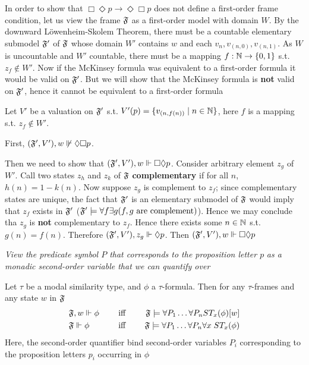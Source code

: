 \documentclass[11pt]{article}
\begin{document}
\begin{examplle}[]
In order to show that \(\Box\Diamond p\to\Diamond\Box p\) does not define a
first-order frame condition, let us view the frame \(\mathfrak{F}\) as a first-order
model with domain \(W\). By the downward Löwenheim-Skolem Theorem, there must
be a countable elementary submodel \(\mathfrak{F}'\) of \(\mathfrak{F}\) whose domain \(W'\)
contains \(w\) and each \(v_n,v_{(n,0)},v_{(n,1)}\). As \(W\) is uncountable
and \(W'\) countable, there must be a mapping \(f:\mathbb{N}\to\{0,1\}\) s.t.
\(z_f\not\in W'\). Now if the McKinsey formula was equivalent to a
first-order formula it would be valid on \(\mathfrak{F}'\). But we will show that the
McKinsey formula is \textbf{not} valid on \(\mathfrak{F}'\), hence it cannot be equivalent to a
first-order formula

Let \(V'\) be a valuation on \(\mathfrak{F}'\) s.t. \(V'(p)=\{v_{(n,f(n))}\mid
   n\in\mathbb{N}\}\), here  \(f\) is a mapping s.t. \(z_f\not\in W'\).

First, \((\mathfrak{F}',V'),w\not\Vdash\Diamond\Box p\).

Then we need to show that \((\mathfrak{F}',V'),w\Vdash\Box\Diamond p\). Consider
arbitrary element \(z_g\) of \(W'\). Call two states \(z_h\) and \(z_k\) of
\(\mathfrak{F}\) \textbf{complementary} if for all \(n\), \(h(n)=1-k(n)\). Now suppose \(z_g\)
is complement to \(z_f\); since complementary states are unique, the fact
that \(\mathfrak{F}'\) is an elementary submodel of \(\mathfrak{F}\) would imply that \(z_f\)
exists in \(\mathfrak{F}'\) (\(\mathfrak{F}'\models\forall f\exists g(f,g\text{ are
   complement})\)). Hence we may conclude tha \(z_g\) is \textbf{not} complementary to
\(z_f\). Hence there exists some \(n\in\mathbb{N}\) s.t. \(g(n)=f(n)\). Therefore
\((\mathfrak{F}',V'),z_g\Vdash\Diamond p\). Then \((\mathfrak{F}',V'),w\Vdash\Box\Diamond p\)
\end{examplle}

\begin{center}
\emph{View the predicate symbol \(P\) that corresponds to the proposition letter
\(p\)}
\emph{as a monadic second-order variable that we can quantify over}
\end{center}

\begin{proposition}[]
Let \(\tau\) be a modal similarity type, and \(\phi\) a \(\tau\)-formula. Then for any
\(\tau\)-frames and any state \(w\) in \(\mathfrak{F}\)
\begin{alignat*}{3}
&\mathfrak{F},w\Vdash\phi&\quad\text{ iff }\quad&&\mathfrak{F}\models\forall P_1\dots\forall P_n ST_x(\phi)[w]\\
&\mathfrak{F}\Vdash\phi&\quad\text{ iff }\quad&&\mathfrak{F}\models\forall P_1\dots\forall P_n \forall x\; ST_x(\phi)
\end{alignat*}
Here, the second-order quantifier bind second-order variables \(P_i\)
corresponding to the proposition letters \(p_i\) occurring in \(\phi\)
\end{proposition}
\end{document}
